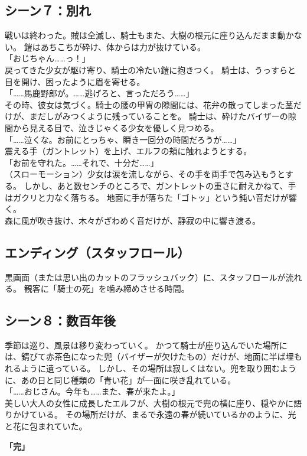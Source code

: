 \subsection{シーン７：別れ}
戦いは終わった。賊は全滅し、騎士もまた、大樹の根元に座り込んだまま動かない。
鎧はあちこちが砕け、体からは力が抜けている。
\\「おじちゃん……っ！」\\
戻ってきた少女が駆け寄り、騎士の冷たい鎧に抱きつく。
騎士は、うっすらと目を開け、困ったように眉を寄せる。
\\「……馬鹿野郎が。……逃げろと、言っただろう……」\\
その時、彼女は気づく。騎士の腰の甲冑の隙間には、花弁の散ってしまった茎だけが、まだしがみつくように残っていることを。
騎士は、砕けたバイザーの隙間から見える目で、泣きじゃくる少女を優しく見つめる。
\\「……泣くな。お前にとっちゃ、瞬き一回分の時間だろうが……」\\
震える手（ガントレット）を上げ、エルフの頬に触れようとする。
\\「お前を守れた。……それで、十分だ……」\\
（スローモーション）少女は涙を流しながら、その手を両手で包み込もうとする。
しかし、あと数センチのところで、ガントレットの重さに耐えかねて、手はガクリと力なく落ちる。
地面に手が落ちた「ゴトッ」という鈍い音だけが響く。\\
森に風が吹き抜け、木々がざわめく音だけが、静寂の中に響き渡る。

\subsection{エンディング（スタッフロール）}
黒画面（または思い出のカットのフラッシュバック）に、スタッフロールが流れる。
観客に「騎士の死」を噛み締めさせる時間。

\subsection{シーン８：数百年後}
季節は巡り、風景は移り変わっていく。
かつて騎士が座り込んでいた場所には、錆びて赤茶色になった兜（バイザーが欠けたもの）だけが、地面に半ば埋もれるように遺っている。
しかし、その場所は寂しくはない。兜を取り囲むように、あの日と同じ種類の「青い花」が一面に咲き乱れている。
\\「……おじさん。今年も……また、春が来たよ。」\\
美しい大人の女性に成長したエルフが、大樹の根元で兜の横に座り、穏やかに語りかけている。
その場所だけが、まるで永遠の春が続いているかのように、光と花に包まれていた。

\textbf{「完」}